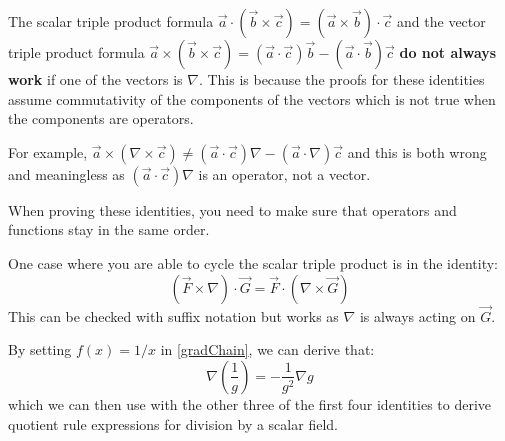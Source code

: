 \documentclass[../main.tex]{subfiles}
\begin{document}
\begin{remark}[Warning]
  The scalar triple product formula $\vec{a} \cdot (\vec{b} \times \vec{c}) = (\vec{a} \times \vec{b}) \cdot \vec{c}$ and the vector triple product formula $\vec{a} \times (\vec{b} \times \vec{c}) = (\vec{a} \cdot \vec{c}) \vec{b} - (\vec{a} \cdot \vec{b}) \vec{c}$ \textbf{do not always work} if one of the vectors is $\nabla$.
  This is because the proofs for these identities assume commutativity of the components of the vectors which is not true when the components are operators.

  For example, $\vec{a} \times (\nabla \times \vec{c}) \neq (\vec{a} \cdot \vec{c})\nabla - (\vec{a} \cdot \nabla)\vec{c}$ and this is both wrong and meaningless as $(\vec{a} \cdot \vec{c}) \nabla$ is an operator, not a vector.

  When proving these identities, you need to make sure that operators and functions stay in the same order.

  One case where you are able to cycle the scalar triple product is in the identity:
  \[
    (\vec{F} \times \nabla) \cdot \vec{G} = \vec{F} \cdot (\nabla \times \vec{G})
  \]
  This can be checked with suffix notation but works as $\nabla$ is always acting on $\vec{G}$.
\end{remark}
By setting $f(x) = 1/x$ in \cref{gradChain}, we can derive that:
\[
  \nabla \left(\frac{1}{g}\right) = - \frac{1}{g^2} \nabla g
\]
which we can then use with the other three of the first four identities to derive quotient rule expressions for division by a scalar field.
\end{document}
